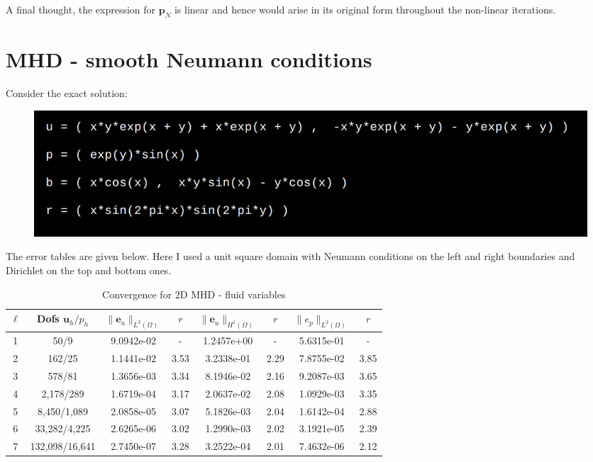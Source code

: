 \documentclass{article}
\newcommand{\uu}[1]{\boldsymbol #1}
\begin{document}
A final thought, the expression for $\uu{p_N}$ is linear and hence would arise in its original form throughout the non-linear iterations.

\section*{MHD - smooth Neumann conditions}

Consider the exact solution:
\begin{figure}[h!]
    \centering
    \includegraphics[width=\textwidth]{Solution}
\end{figure}


The error tables are given below. Here I used a unit square domain with Neumann conditions on the left and right boundaries and Dirichlet on the top and bottom ones.
\begin{table}[h!]
\begin{center}
\begin{tabular}{cccccccc}
\hline \hline

$\ell$ &    Dofs $\uu{u}_h/p_h$ & $\|\uu{e}_u\|_{L^2(\Omega)}$ & $r$ & $\|\uu{e}_u\|_{H^1(\Omega)}$ & $r$ &$\|e_p\|_{L^2(\Omega)}$ & $r$  \\
\hline
\hline
1 &      50/9 &  9.0942e-02 &     - &  1.2457e+00 &     - &  5.6315e-01 &      - \\
2 &     162/25 &  1.1441e-02 &     3.53 &  3.2338e-01 &     2.29 &  7.8755e-02 &      3.85 \\
3 &     578/81 &  1.3656e-03 &     3.34 &  8.1946e-02 &     2.16 &  9.2087e-03 &      3.65 \\
4 &    2,178/289 &  1.6719e-04 &     3.17 &  2.0637e-02 &     2.08 &  1.0929e-03 &      3.35 \\
5 &    8,450/1,089 &  2.0858e-05 &     3.07 &  5.1826e-03 &     2.04 &  1.6142e-04 &      2.88 \\
6 &   33,282/4,225 &  2.6265e-06 &     3.02 &  1.2990e-03 &     2.02 &  3.1921e-05 &      2.39 \\
7 &  132,098/16,641 &  2.7450e-07 &     3.28 &  3.2522e-04 &     2.01 &  7.4632e-06 &      2.12 \\
\hline\hline
\end{tabular}

\caption{Convergence for 2D MHD - fluid variables}
\label{tab:MHD_2D_smooth_fluids_velocity}
\end{center}
\end{table}
\end{document}
